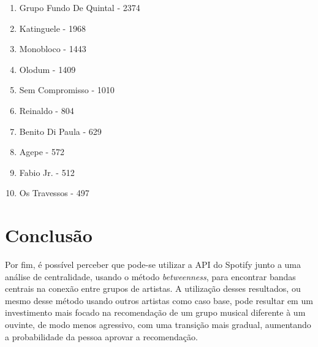 \documentclass[12pt]{article}
\begin{document}
\begin{enumerate}  
	\item Grupo Fundo De Quintal - 2374
	\item Katinguele - 1968
	\item Monobloco - 1443
	\item Olodum - 1409
	\item Sem Compromisso - 1010
	\item Reinaldo - 804
	\item Benito Di Paula - 629
	\item Agepe - 572
	\item Fabio Jr. - 512
	\item Os Travessos - 497
\end{enumerate}


\section{Conclusão}\label{conclusions}
Por fim, é possível perceber que pode-se utilizar a API do Spotify junto a uma análise de centralidade, usando o método \textit{betweenness}, para encontrar bandas centrais na conexão entre grupos de artistas. A utilização desses resultados, ou mesmo desse método usando outros artistas como caso base, pode resultar em um investimento mais focado na recomendação de um grupo musical diferente à um ouvinte, de modo menos agressivo, com uma transição mais gradual, aumentando a probabilidade da pessoa aprovar a recomendação.



\end{document}
